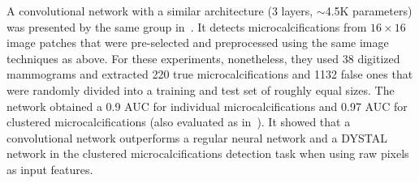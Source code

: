 \begin{comment}
- similar to Lo 1995:
	detect microcalcifications
	pre-selected image patches
	8 rotations per image(0,90,180,270 and flipped)
	sigmoid activation function
	16 by 16 pixel size
	5 by 5 filters
	2 outputs
	clustering method
- only 10 groups per layer
- "Typically, the sizes of microcalcifications vary from 0.16 mm to 1.0 mm."
- each pixel 0.1mm, more than that may make dissapear the microcalc.
- DYSTAL network, regular neural network, and convolutional network. convnet ouptperforms them.
- rotation and translation invariance.
- gaussian-like activation function in input (?)
- 38 "digital" mammograms: 220 true and 1132 subtle microcalcififcations
- divided into two roughly equal sets for test (no cross validation)
- 0.9 AUC for microcalc and 0.97 AUC for clustered microcalcif
\end{comment}
A convolutional network with a similar architecture (3 layers, $\sim$4.5K parameters) was presented by the same group in~\cite{Lo1998}. It detects microcalcifications from $16 \times 16$ image patches that were pre-selected and preprocessed using the same image techniques as above. For these experiments, nonetheless, they used 38 digitized mammograms and extracted 220 true microcalcifications and 1132 false ones that were randomly divided into a training and test set of roughly equal sizes. The network obtained a 0.9 AUC for individual microcalcifications and 0.97 AUC for clustered microcalcifications (also evaluated as in~\cite{Lo1995}). It showed that a convolutional network outperforms a regular neural network and a DYSTAL network in the clustered microcalcifications detection task when using raw pixels as input features.







